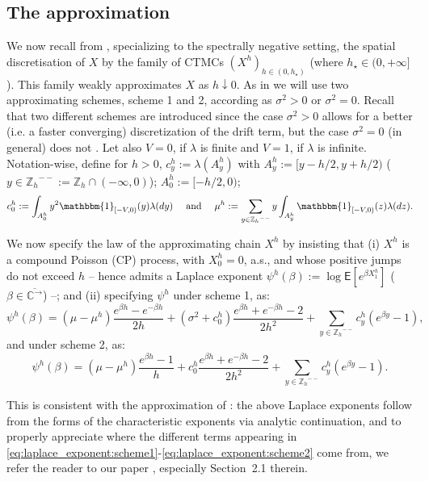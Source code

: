 \documentclass[pdftex,oneside,11pt,reqno]{amsart}
\theoremstyle{definition}
\theoremstyle{theorem}
\theoremstyle{remark}
\numberwithin{equation}{section}
\numberwithin{definition}{section}
\begin{document}
\subsection{The approximation}\label{subsection:the_approximation}
We now recall from \cite{vidmarmijatovicsaul}, specializing to the spectrally negative setting, the spatial discretisation of $X$ by the family of CTMCs $(X^h)_{h\in (0,h_\star)}$  (where $h_\star\in (0,+\infty]$). This family weakly approximates $X$ as $h\downarrow 0$. As in  \cite{vidmarmijatovicsaul} we will use two approximating schemes, scheme 1 and 2, according as ${\sigma^2}>0$ or ${\sigma^2}=0$. Recall that two different schemes are introduced since the case ${\sigma^2}>0$ allows for a better (i.e. a faster converging) discretization of the drift term, but the case ${\sigma^2}=0$ (in general) does not \cite[Paragraph~2.2.1]{vidmarmijatovicsaul}. Let also $V=0$, if ${\lambda}$ is finite and $V=1$, if ${\lambda}$ is infinite. 
Notation-wise, define for $h>0$,
$c^h_{y}:={\lambda}(A_y^h)$ with $A_y^h:=[y-h/2,y+h/2)$ ($y\in
{\mathbb{Z}_h}^{--}:={\mathbb{Z}_h}\cap (-\infty,0)$); $A_0^h:=[-h/2,0)$;
$$c^h_0:=\int_{A_0^h}y^2{\mathbbm{1}_{[-V,0)}}(y){\lambda}(dy)\quad\text{ and }\quad{\mu}^h:=\sum_{y\in
{\mathbb{Z}_h}^{--}}y\int_{A_y^h}{\mathbbm{1}_{[-V,0)}}(z){\lambda}(dz).$$ 

We now specify the law of the approximating chain $X^h$ by insisting that (i) $X^h$ is a compound Poisson (CP)
process, with $X^h_0=0$, a.s., and whose positive jumps do not exceed $h$ -- hence admits a Laplace exponent $\psi^h(\beta):=\log{\mathsf E}[e^{\beta X^h_1}]$ ($\beta\in {\overline{\mathbb{C}^{\rightarrow}}}$) --; and (ii) specifying $\psi^h$ under scheme 1, as:
\begin{equation}\label{eq:laplace_exponent:scheme1}
\psi^h(\beta)=({\mu}-{\mu}^h) \frac{e^{\beta h}-e^{-\beta h}}{2h}+({\sigma^2}+c_0^h)\frac{e^{\beta  h}+e^{-\beta h}-2}{2h^2}+\sum_{y\in {\mathbb{Z}_h}^{--}}c_y^h\left(e^{\beta y}-1\right),
\end{equation}
and under scheme 2, as:
\begin{equation}
\psi^h(\beta)=({\mu}-{\mu}^h)\frac{e^{\beta h}-1}{h} + c_0^h\frac{e^{\beta h}+e^{-\beta h}-2}{2h^2} +\sum_{y\in {\mathbb{Z}_h}^{--}}c_y^h\left(e^{\beta y}-1\right).
\label{eq:laplace_exponent:scheme2}
\end{equation}

This is consistent with the approximation of \cite{vidmarmijatovicsaul}: the above Laplace exponents follow from the forms of the characteristic exponents \cite[Eq.~(3.1)
and~(3.2)]{vidmarmijatovicsaul} via analytic
continuation, and to properly appreciate where the different terms appearing in \eqref{eq:laplace_exponent:scheme1}-\eqref{eq:laplace_exponent:scheme2} come from, we refer the reader to our paper \cite{vidmarmijatovicsaul}, especially Section~2.1 therein. 
\end{document}
